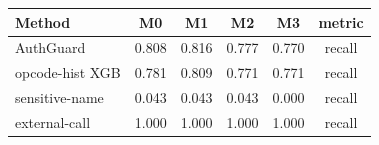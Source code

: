 \begin{tabular}{lccccc}
\toprule
Method & M0 & M1 & M2 & M3 & metric \\
\midrule
AuthGuard & 0.808 & 0.816 & 0.777 & 0.770 & recall \\
opcode-hist XGB & 0.781 & 0.809 & 0.771 & 0.771 & recall \\
sensitive-name & 0.043 & 0.043 & 0.043 & 0.000 & recall \\
external-call & 1.000 & 1.000 & 1.000 & 1.000 & recall \\
\bottomrule
\end{tabular}

